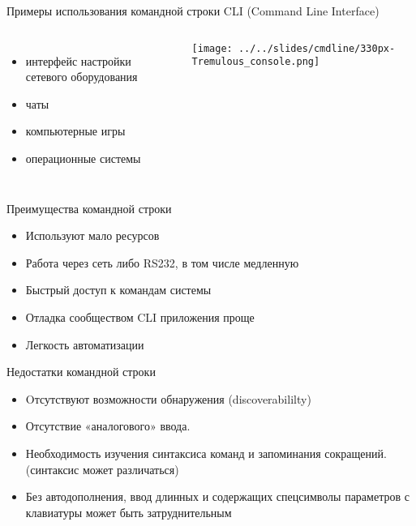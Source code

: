 
\begin{frame}{Примеры использования командной строки}
        CLI (Command Line Interface)
	\begin{columns}
        \begin{itemize}
            \item интерфейс настройки сетевого оборудования
            \item чаты
            \item компьютерные игры
            \item операционные системы
        \end{itemize}
    \texttt{[image: ../../slides/cmdline/330px-Tremulous\_console.png]}
	\end{columns}
\end{frame}

\begin{frame}{Преимущества командной строки}
	\begin{itemize}
                \item Используют мало ресурсов
		\item Работа через сеть либо RS232, в том числе медленную
		\item Быстрый доступ к командам системы
		\item Отладка сообществом CLI приложения проще
		\item Легкость автоматизации
	\end{itemize}
\end{frame}

\begin{frame}{Недостатки командной строки}
	\begin{itemize}
		\item Oтсутствуют возможности обнаружения (discoverabililty)
		\item Отсутствие «аналогового» ввода.
		\item Необходимость изучения синтаксиса команд и запоминания сокращений.  (синтаксис может различаться)
		\item Без автодополнения, ввод длинных и содержащих спецсимволы параметров с клавиатуры может быть затруднительным
	\end{itemize}
\end{frame}


